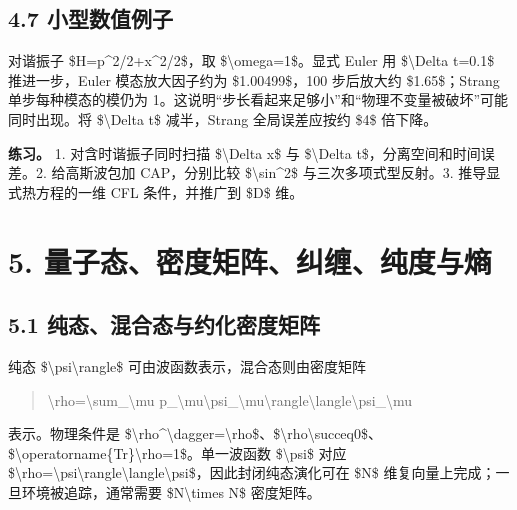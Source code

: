 \documentclass[UTF8,openany,11pt,fontset=fandol]{ctexbook}
\begin{document}
\subsection{\texorpdfstring{\textbf{4.7
小型数值例子}}{4.7 小型数值例子}}\label{ux5c0fux578bux6570ux503cux4f8bux5b50-1}

对谐振子 \$H=p\^{}2/2+x\^{}2/2\$，取 \$\textbackslash omega=1\$。显式
Euler 用 \$\textbackslash Delta t=0.1\$ 推进一步，Euler 模态放大因子约为
\$1.00499\$，100 步后放大约 \$1.65\$；Strang 单步每种模态的模仍为
1。这说明``步长看起来足够小''和``物理不变量被破坏''可能同时出现。将
\$\textbackslash Delta t\$ 减半，Strang 全局误差应按约 \$4\$ 倍下降。

\textbf{练习。} 1. 对含时谐振子同时扫描 \$\textbackslash Delta x\$ 与
\$\textbackslash Delta t\$，分离空间和时间误差。2. 给高斯波包加
CAP，分别比较 \$\textbackslash sin\^{}2\$ 与三次多项式型反射。3.
推导显式热方程的一维 CFL 条件，并推广到 \$D\$ 维。

\section{\texorpdfstring{\textbf{5.
量子态、密度矩阵、纠缠、纯度与熵}}{5. 量子态、密度矩阵、纠缠、纯度与熵}}\label{ux91cfux5b50ux6001ux5bc6ux5ea6ux77e9ux9635ux7ea0ux7f20ux7eafux5ea6ux4e0eux71b5}

\subsection{\texorpdfstring{\textbf{5.1
纯态、混合态与约化密度矩阵}}{5.1 纯态、混合态与约化密度矩阵}}\label{ux7eafux6001ux6df7ux5408ux6001ux4e0eux7ea6ux5316ux5bc6ux5ea6ux77e9ux9635}

纯态 \$\textbar\textbackslash psi\textbackslash rangle\$
可由波函数表示，混合态则由密度矩阵

\begin{quote}
\textbackslash rho=\textbackslash sum\_\textbackslash mu
p\_\textbackslash mu\textbar\textbackslash psi\_\textbackslash mu\textbackslash rangle\textbackslash langle\textbackslash psi\_\textbackslash mu\textbar{}
\end{quote}

表示。物理条件是
\$\textbackslash rho\^{}\textbackslash dagger=\textbackslash rho\$、\$\textbackslash rho\textbackslash succeq0\$、\$\textbackslash operatorname\{Tr\}\textbackslash rho=1\$。单一波函数
\$\textbackslash psi\$ 对应
\$\textbackslash rho=\textbar\textbackslash psi\textbackslash rangle\textbackslash langle\textbackslash psi\textbar\$，因此封闭纯态演化可在
\$N\$ 维复向量上完成；一旦环境被追踪，通常需要 \$N\textbackslash times
N\$ 密度矩阵。
\end{document}
